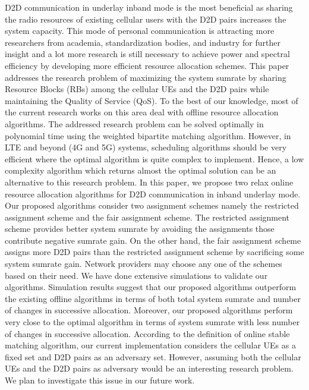 \documentclass[times]{dacauth}
\begin{document}
D2D communication in underlay inband mode is the most beneficial as sharing the radio resources of existing cellular users with the D2D pairs increases the system capacity. This mode of personal communication is attracting more researchers from academia, standardization bodies, and industry for further insight and a lot more research is still necessary to achieve power and spectral efficiency by developing more efficient resource allocation schemes. This paper addresses the research problem of maximizing the system sumrate by sharing Resource Blocks (RBs) among the cellular UEs and the D2D pairs while maintaining the Quality of Service (QoS). To the best of our knowledge, most of the current research works on this area deal with offline resource allocation algorithms. The addressed research problem can be solved optimally in polynomial time using the weighted bipartite matching algorithm. However, in LTE and beyond (4G and 5G) systems, scheduling algorithms should be very efficient where the optimal algorithm is quite complex to implement. Hence, a low complexity algorithm which returns almost the optimal solution can be an alternative to this research problem. In this paper, we propose two relax online resource allocation algorithms for D2D communication in inband underlay mode. Our proposed algorithms consider two assignment schemes namely the restricted assignment scheme and the fair assignment scheme. The restricted assignment scheme provides better system sumrate by avoiding the assignments those contribute negative sumrate gain. On the other hand, the fair assignment scheme assigns more D2D pairs than the restricted assignment scheme by sacrificing some system sumrate gain. Network providers may choose any one of the schemes based on their need. We have done extensive simulations to validate our algorithms. Simulation results suggest that our proposed algorithms outperform the  existing offline algorithms in terms of both total system sumrate and number of changes in successive allocation. Moreover, our proposed algorithms perform very close to the optimal algorithm in terms of system sumrate with less number of changes in successive allocation. According to the definition of online stable matching algorithm, our current implementation considers the cellular UEs as a fixed set and D2D pairs as an adversary set. However, assuming both the cellular UEs and the D2D pairs as adversary would be an interesting research problem. We plan to investigate this issue in our future work.




\end{document}
